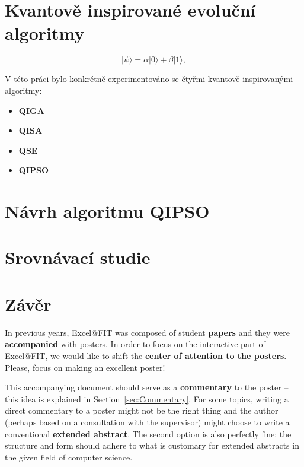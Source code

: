 \documentclass[czech]{ExcelAtFIT} %
\begin{document}
\section{Kvantově inspirované evoluční algoritmy}
\label{sec:Introduction}

\begin{equation}\label{eq:psi=a0+b1}
	| \psi \rangle = \alpha | 0 \rangle + \beta | 1 \rangle, 
\end{equation}
	

V této práci bylo konkrétně experimentováno se čtyřmi kvantově inspirovanými algoritmy:
\begin{itemize}
	\item \textbf{QIGA}
	\item \textbf{QISA}
	\item \textbf{QSE}
	\item \textbf{QIPSO}
\end{itemize}

\section{Návrh algoritmu QIPSO}

\section{Srovnávací studie}

\section{Závěr}

\newpage
In previous years, Excel@FIT was composed of student \textbf{papers} and they were \textbf{accompanied} with posters.
In order to focus on the interactive part of Excel@FIT, we would like to shift the \textbf{center of attention to the posters}.
Please, focus on making an excellent poster!

This accompanying document should serve as a \textbf{commentary} to the poster -- this idea is explained in Section~\ref{sec:Commentary}.
For some topics, writing a direct commentary to a poster might not be the right thing and the author (perhaps based on a consultation with the supervisor) might choose to write a conventional \textbf{extended abstract}.  The second option is also perfectly fine; the structure and form should adhere to what is customary for extended abstracts in the given field of computer science.

\end{document}
